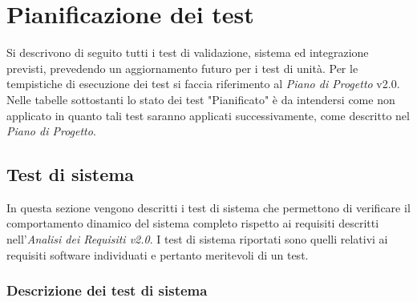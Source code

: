 \newcommand{\teststatus}{Pianificato}

\section {Pianificazione dei test}

Si descrivono di seguito tutti i test di validazione, sistema ed integrazione previsti, prevedendo un aggiornamento futuro per i test di unità. Per le tempistiche di esecuzione dei test si faccia riferimento al \textit{Piano di Progetto} v2.0. Nelle tabelle sottostanti lo stato dei test "Pianificato" è da intendersi come non applicato in quanto tali test saranno applicati successivamente, come descritto nel \textit{Piano di Progetto}.

\subsection {Test di sistema}

In questa sezione vengono descritti i test di sistema che permettono di verificare il comportamento dinamico del sistema completo rispetto ai requisiti descritti nell’\textit{Analisi dei Requisiti v2.0}.
I test di sistema riportati sono quelli relativi ai requisiti software individuati e pertanto meritevoli di un test.

\subsubsection{Descrizione dei test di sistema}

